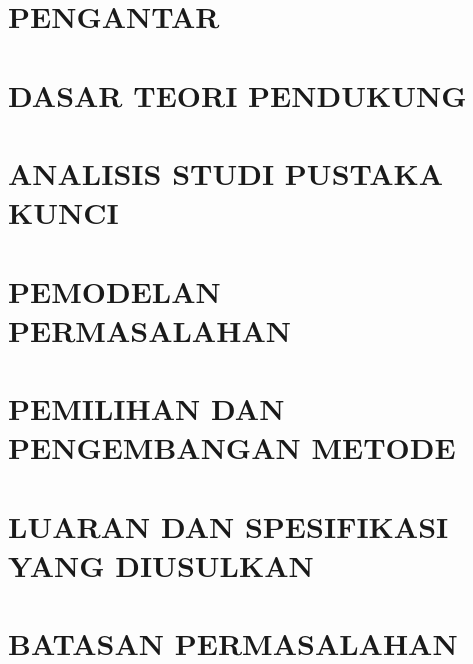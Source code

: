 \documentclass{data/example/DTETI_Capstone_C251}
\begin{document}


\maketitle

\chapter{\uppercase{Pengantar}}
\label{chap:Pengantar}


\chapter{\uppercase{Dasar Teori Pendukung}}
\label{chap:Dasar_Teori_Pendukung}


\chapter{\uppercase{Analisis Studi Pustaka Kunci}}
\label{chap:Analisis_Studi_Pustaka_Kunci}


\chapter{\uppercase{Pemodelan Permasalahan}}
\label{chap:Pemodelan_Permasalahan}


\chapter{\uppercase{Pemilihan dan Pengembangan Metode}}
\label{chap:Pemilihan_dan_Pengembangan_Metode}


\chapter{\uppercase{Luaran dan Spesifikasi yang Diusulkan}}
\label{chap:Luaran_dan_Spesifikasi_yang_Diusulkan}


\chapter{\uppercase{Batasan Permasalahan}}
\label{chap:Batasan_Permasalahan}

\end{document}
